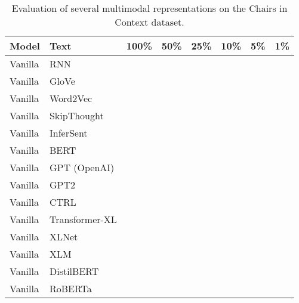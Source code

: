 \documentclass[11pt,a4paper]{article}
\begin{document}
\begin{table*}[t!]
\centering
\begin{tabular}{llcccccc}
\hline
\textbf{Model} & \textbf{Text} & \textbf{100\%} & \textbf{50\%} & \textbf{25\%} & \textbf{10\%} & \textbf{5\%} & \textbf{1\%} \\
\hline
Vanilla & RNN & & & & & & \\
Vanilla & GloVe & & & & & & \\
Vanilla & Word2Vec & & & & & & \\
Vanilla & SkipThought & & & & & & \\
Vanilla & InferSent & & & & & & \\
Vanilla & BERT & & & & & & \\
Vanilla & GPT (OpenAI) & & & & & & \\
Vanilla & GPT2 & & & & & & \\
Vanilla & CTRL & & & & & & \\
Vanilla & Transformer-XL & & & & & & \\
Vanilla & XLNet & & & & & & \\
Vanilla & XLM & & & & & & \\
Vanilla & DistilBERT & & & & & & \\
Vanilla & RoBERTa & & & & & & \\
\hline
\end{tabular}
\caption{\label{table:colors} Evaluation of several multimodal representations on the Chairs in Context dataset.}
\end{table*}
\end{document}
